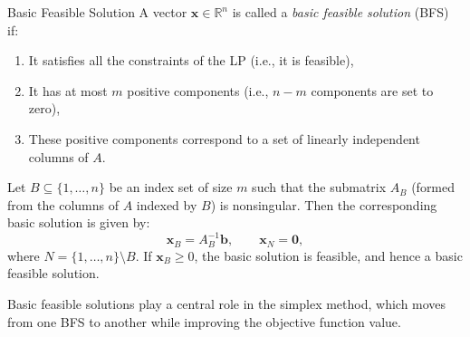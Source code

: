 \begin{definition}{Basic Feasible Solution} A vector \( \mathbf{x} \in \mathbb{R}^n \) is called a \emph{basic feasible solution} (BFS) if:
\begin{enumerate}
    \item It satisfies all the constraints of the LP (i.e., it is feasible),
    \item It has at most \( m \) positive components (i.e., \( n - m \) components are set to zero),
    \item These positive components correspond to a set of linearly independent columns of \( A \).
\end{enumerate}

\smallskip

Let \( B \subseteq \{1, \dots, n\} \) be an index set of size \( m \) such that the submatrix \( A_B \) (formed from the columns of \( A \) indexed by \( B \)) is nonsingular. Then the corresponding basic solution is given by:
\[
\mathbf{x}_B = A_B^{-1} \mathbf{b}, \qquad \mathbf{x}_N = \mathbf{0},
\]
where \( N = \{1, \dots, n\} \setminus B \). If \( \mathbf{x}_B \geq 0 \), the basic solution is feasible, and hence a basic feasible solution.
\end{definition}
\smallskip

\noindent Basic feasible solutions play a central role in the simplex method, which moves from one BFS to another while improving the objective function value.

